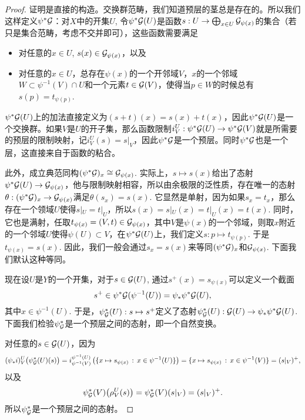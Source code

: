 \begin{proof} 
	证明是直接的构造。交换群范畴，我们知道预层的茎总是存在的。所以我们这样定义$\psi^*\mathcal{G}$：对$X$中的开集$U$, 令$\psi^*\mathcal{G}(U)$是函数$s:U\to \bigoplus_{x\in U}\mathcal{G}_{\psi(x)}$的集合（若只是集合范畴，考虑不交并即可），这些函数需要满足
	\begin{itemize}
		\item 对任意的$x\in U$, $s(x)\in \mathcal{G}_{\psi(x)}$，以及

		\item 对任意的$x\in U$，总存在$\psi(x)$的一个开邻域$V$，$x$的一个邻域$W\subset \psi^{-1}(V)\cap U$和一个元素$t\in \mathcal{G}(V)$，使得当$p\in W$的时候总有$s(p)=t_{\psi(p)}$.
	\end{itemize}
	$\psi^*\mathcal{G}(U)$上的加法直接定义为$(s+t)(x)=s(x)+t(x)$，因此$\psi^*\mathcal{G}(U)$是一个交换群。如果$V$是$U$的开子集，那么函数限制$i^U_V:\psi^*\mathcal{G}(U)\to \psi^*\mathcal{G}(V)$就是所需要的预层的限制映射，记$i^U_V(s)=s|_V$，因此$\psi^*\mathcal{G}$是一个预层。同时$\psi^*\mathcal{G}$也是一个层，这直接来自于函数的粘合。

	此外，成立典范同构$(\psi^*\mathcal{G})_x\cong \mathcal{G}_{\psi(x)}$. 实际上，$s\mapsto s(x)$给出了态射$\psi^*\mathcal{G}(U)\to \mathcal{G}_{\psi(x)}$，他与限制映射相容，所以由余极限的泛性质，存在唯一的态射$\theta:(\psi^*\mathcal{G})_x\to \mathcal{G}_{\psi(x)}$满足$\theta(s_x)=s(x)$. 它显然是单射，因为如果$s_x=t_x$，那么存在一个领域$U$使得$s|_U=t|_U$，所以$s(x)=s|_U(x)=t|_U(x)=t(x)$. 同时，它也是满射，任取$t_{\psi(x)}=(V,t)\in \mathcal{G}_{\psi(x)}$，其中$V$是$\psi(x)$的一个邻域，则取$x$附近的一个邻域$U$使得$\psi(U)\subset V$，在$\psi^*\mathcal{G}(U)$上，我们定义$s:p\mapsto t_{\psi(p)}$. 于是$t_{\psi(x)}=s(x)$. 因此，我们一般会通过$s_x=s(x)$来等同$(\psi^*\mathcal{G})_x$和$\mathcal{G}_{\psi(x)}$. 下面我们默认这种等同。

	现在设$U$是$Y$的一个开集，对于$s\in \mathcal{G}(U)$, 通过$s^+(x)=s_{\psi(x)}$可以定义一个截面
	\[
		s^+\in \psi^*\mathcal{G}(\psi^{-1}(U))=\psi_*\psi^*\mathcal{G}(U),
	\]
	其中$x\in \psi^{-1}(U)$. 于是，$\psi^*_{\mathcal{G}}(U):s\mapsto s^+$定义了态射$\psi^*_{\mathcal{G}}(U):\mathcal{G}(U)\to \psi_*\psi^*\mathcal{G}(U)$. 下面我们检验$\psi^*_{\mathcal{G}}$是一个预层之间的态射，即一个自然变换。

	对任意的$s\in \mathcal{G}(U)$，因为
	\[
		(\psi_* i)^U_V\bigl(\psi^*_{\mathcal{G}}(U)(s)\bigr)=i^{\psi^{-1}(U)}_{\psi^{-1}(V)}\left(\{x\mapsto s_{\psi(x)}\,:\, x\in \psi^{-1}(U)\}\right)=\{x\mapsto s_{\psi(x)}\,:\, x\in \psi^{-1}(V)\}=(s|_V)^+,
	\]
	以及
	\[
		\psi^*_{\mathcal{G}}(V)\bigl(\rho^U_V(s)\bigr)=\psi^*_{\mathcal{G}}(V)(s|_V)=(s|_V)^+.
	\]
	所以$\psi^*_{\mathcal{G}}$是一个预层之间的态射。


\end{proof}
